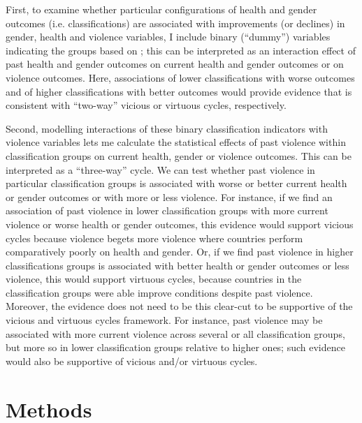 \documentclass[12pt]{article}
\begin{document}
First, to examine whether particular configurations of health and gender outcomes (i.e. classifications) are associated with improvements (or declines) in gender, health and violence variables, I include binary (\enquote{dummy}) variables indicating the groups based on ; this can be interpreted as an interaction effect of past health and gender outcomes on current health and gender outcomes or on violence outcomes. Here, associations of lower classifications with worse outcomes and of higher classifications with better outcomes would provide evidence that is consistent with \enquote{two-way} vicious or virtuous cycles, respectively.

Second, modelling interactions of these binary classification indicators with violence variables lets me calculate the statistical effects of past violence within classification groups on current health, gender or violence outcomes. This can be interpreted as a \enquote{three-way} cycle. We can test whether past violence in particular classification groups is associated with worse or better current health or gender outcomes or with more or less violence. For instance, if we find an association of past violence in lower classification groups with more current violence or worse health or gender outcomes, this evidence would support vicious cycles because violence begets more violence where countries perform comparatively poorly on health and gender. Or, if we find past violence in higher classifications groups is associated with better health or gender outcomes or less violence, this would support virtuous cycles, because countries in the classification groups were able improve conditions despite past violence. Moreover, the evidence does not need to be this clear-cut to be supportive of the vicious and virtuous cycles framework. For instance, past violence may be associated with more current violence across several or all classification groups, but more so in lower classification groups relative to higher ones; such evidence would also be supportive of vicious and/or virtuous cycles.

\section{Methods}
\label{methods}
\end{document}
